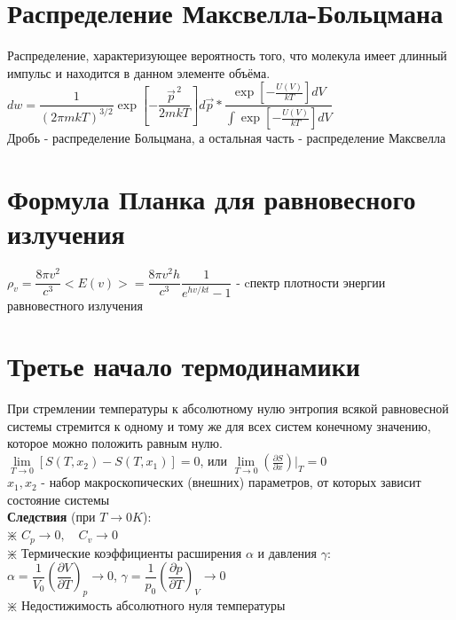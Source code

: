 \begin{multicols*}{2}
		\section{Распределение Максвелла-Больцмана}
		Распределение, характеризующее вероятность того, что молекула имеет длинный импульс и находится в данном элементе объёма.\\
		$dw=\dfrac 1 {(2\pi mkT)^{3/2}}\exp\left[-\dfrac{\vec {p}^{\,2}}{2mkT}\right]d\vec p * \dfrac{\exp\left[-\frac{U(V)}{kT}\right]dV}{\int\exp\left[-\frac{U(V)}{kT}\right]dV}$ \\
		Дробь - распределение Больцмана, а остальная часть - распределение Максвелла\\

		\section{Формула Планка для равновесного излучения}
		$\rho_v=\dfrac{8\pi v^2}{c^3}<E(v)>=\dfrac{8\pi v^2 h}{c^3}\dfrac{1}{e^{hv/kt}-1}$ - cпектр плотности энергии равновестного излучения\\

		\section{Третье начало термодинамики}
		При стремлении температуры к абсолютному  нулю энтропия всякой равновесной системы стремится к одному и тому же для всех систем конечному значению, которое можно положить равным нулю.\\
		$\lim\limits_{T\to 0} [S(T, x_2) - S(T, x_1)] =0$, или $\lim\limits_{T\to 0} \left(\frac{\partial S}{\partial x}\right)\vert _T = 0$\\
		$x_1, x_2$ - набор макроскопических (внешних) параметров, от которых зависит состояние системы\\
		\textbf{Следствия} (при $T\rightarrow 0K$):\\
		$\divideontimes$ $C_p \rightarrow 0, \quad C_v \rightarrow 0$\\
		$\divideontimes$ Термические коэффициенты расширения $\alpha$ и давления $\gamma$:\\
		$\alpha = \dfrac{1}{V_0}\left(\dfrac{\partial V}{\partial T}\right)_p \rightarrow 0$, \quad $\gamma = \dfrac{1}{p_0}\left(\dfrac{\partial p}{\partial T}\right)_V \rightarrow 0$\\
		$\divideontimes$ Недостижимость абсолютного нуля температуры\\


\end{multicols*}
